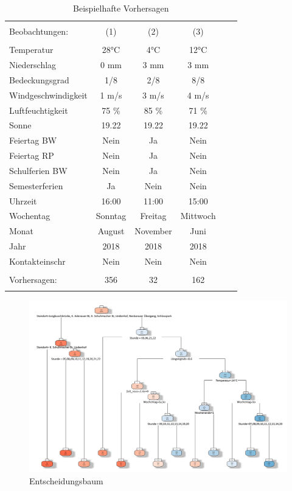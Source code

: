 \documentclass[a4paper,12pt]{thesis}
\begin{document}
\begin{table}[!htbp] \centering 
	\caption{Beispielhafte Vorhersagen} 
	\label{ForecastsExample} 
	\begin{tabular}{@{\extracolsep{-5pt}}lccccc} 
		\\[-1.8ex]\hline 
		\hline \\[-1.8ex] 
		Beobachtungen: & (1) & (2) & (3) \\ 
		\hline \\[-1.8ex] 
		Temperatur & 28°C & 4°C & 12°C\\
		Niederschlag & 0 mm & 3 mm &  3 mm\\
		Bedeckungsgrad & 1/8 & 2/8 & 8/8\\
		Windgeschwindigkeit &  1 m/s & 3 m/s & 4 m/s\\
		Luftfeuchtigkeit &  75 \% & 85 \% & 71 \% \\
		Sonne & 19.22 & 19.22 & 19.22\\
		Feiertag BW & Nein & Ja & Nein \\
		Feiertag RP & Nein & Ja & Nein \\
		Schulferien BW & Nein & Ja & Nein \\
		Semesterferien & Ja & Nein & Nein \\
		Uhrzeit & 16:00 & 11:00 & 15:00 \\
		Wochentag & Sonntag & Freitag & Mittwoch \\
		Monat & August & November & Juni \\
		Jahr & 2018 & 2018 & 2018 \\
		Kontakteinschr & Nein & Nein & Nein \\
		\hline \\[-1.8ex]
		Vorhersagen: & 356 & 32 & 162 \\ 
		\hline \\[-1.8ex] 
	\end{tabular} 
\end{table} 

\begin{figure}[!ht]
	\centering
	\includegraphics[width=\textwidth]{Plots/Entscheidungsbaum.png}
	\caption{Entscheidungsbaum}
	\label{DecisionTree}
\end{figure}

\newpage
{}

\end{document}
